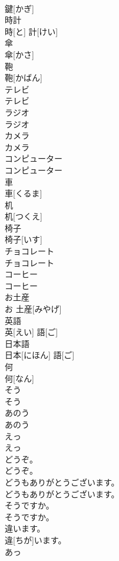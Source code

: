 \documentclass[8pt]{extreport}
\begin{document}
\begin{CJK}{UTF8}{min}
\\	鍵[かぎ]		
\\	時計	
\\	時[と] 計[けい]		
\\	傘	
\\	傘[かさ]		
\\	鞄	
\\	鞄[かばん]		
\\	テレビ	
\\	テレビ		
\\	ラジオ	
\\	ラジオ		
\\	カメラ	
\\	カメラ		
\\	コンピューター	
\\	コンピューター		
\\	車	
\\	車[くるま]		
\\	机	
\\	机[つくえ]		
\\	椅子	
\\	椅子[いす]		
\\	チョコレート	
\\	チョコレート		
\\	コーヒー	
\\	コーヒー		
\\	お土産	
\\	お 土産[みやげ]		
\\	英語	
\\	英[えい] 語[ご]		
\\	日本語	
\\	日本[にほん] 語[ご]		
\\	何	
\\	何[なん]		
\\	そう	
\\	そう		
\\	あのう	
\\	あのう		
\\	えっ	
\\	えっ		
\\	どうぞ。	
\\	どうぞ。		
\\	どうもありがとうございます。	
\\	どうもありがとうございます。		
\\	そうですか。	
\\	そうですか。		
\\	違います。	
\\	違[ちが]います。		
\\	あっ	

\end{CJK}
\end{document}
